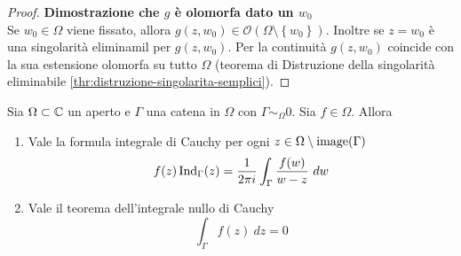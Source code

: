 \begin{proof}
   \textbf{Dimostrazione che $g$ è olomorfa dato un $w_0$} \\

   Se $w_0 \in \Omega$ viene fissato, allora $g(z, w_0) \in
   \mathcal{O}(\Omega\setminus\left\{ w_0 \right\})$. Inoltre se $z = w_0$
   è una singolarità eliminamil per $g(z,w_0)$. Per la continuità $g(z,w_0)$
   coincide con la sua estensione olomorfa su tutto $\Omega$ (teorema di
     Distruzione della singolarità eliminabile
   \ref{thr:distruzione-singolarita-semplici}).
 \end{proof}

\begin{theorem}
Sia $\Omega \subset \mathbb{C}$ un aperto e $\Gamma$ una catena in $\Omega$ con
$\Gamma \sim_\Omega 0$. Sia $f \in \mathcal{\Omega}$. Allora 
\begin{enumerate}
    \item Vale la formula integrale di Cauchy per ogni $z \in \Omega \setminus
        \operatorname{image}(\Gamma)$  
        \begin{equation*}
            f(z) \operatorname{Ind}_\Gamma(z) = \frac{1}{2\pi i} \int_\Gamma
            \frac{f(w)}{w-z}\ dw
        \end{equation*}
    \item Vale il teorema dell'integrale nullo di Cauchy 
        \begin{equation*}
            \int_\Gamma f(z) \ dz = 0
        \end{equation*}
\end{enumerate}
\label{thr:formule-di-cauchy-generale}
\end{theorem}

